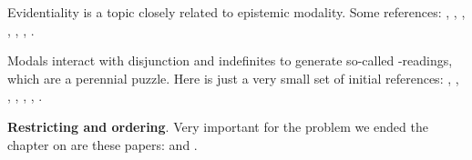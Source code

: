 Evidentiality is a topic closely related to epistemic modality. Some references:
\cite{willett-1988-evidentials}, \cite{aikhenvald-2004-evidentiality},
\cite{drubig-2001-epistemic}, \cite{blain-dechaine-2007-evidentials},
\cite{mccready-ogata-2007-evidentials}, \cite{speas-2008-evidentials},
\cite{fintel-gillies-2010-mss}.

Modals interact with disjunction and indefinites to generate so-called
-readings, which are a perennial puzzle. Here is just a very
small set of initial references: \cite{kamp-1973-freechoice},
\cite{zimmermann-2000-fc-disjunction}, \cite{schulz-2005-fcp-synthese},
\cite{aloni-2007-freechoice}, \cite{alonso-ovalle-2006-thesis},
\cite{fox-2007-freechoice}, \cite{rooij-2006-donkeys}.

\textbf{Restricting and ordering}. Very important for the problem we ended the
chapter on are these papers:
\cite{kaufmann-schwager-2009-conditional-imperatives} and
\cite{condoravdi-lauer-2016-anankastic}. 


